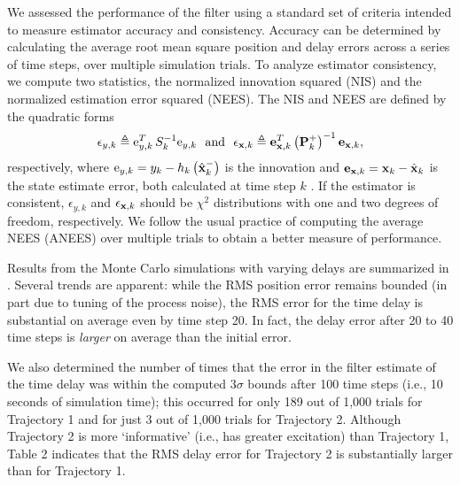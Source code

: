 \documentclass[letterpaper,10pt,conference]{ieeeconf}
\theoremstyle{definition}
\begin{document}
We assessed the performance of the filter using a standard set of criteria intended to measure estimator accuracy and consistency.
%
Accuracy can be determined by calculating the average root mean square position and delay  errors across a series of time steps, over multiple simulation trials.
%
To analyze estimator consistency, we compute two statistics, the normalized innovation squared (NIS) and the normalized estimation error squared (NEES). The NIS and NEES are defined by the quadratic forms
%
\begin{equation*}
\label{eqn:nees}
\epsilon_{y, k} \triangleq 
\mathrm{e}_{y, k}^{T}\,S_{k}^{-1} \mathrm{e}_{y, k}~~\text{and}~~
%
\epsilon_{\vect{x}, k} \triangleq 
\mathbf{e}_{\vect{x}, k}^{T} \left(\matr{P}^{+}_{k}\right)^{-1} \mathbf{e}_{\vect{x}, k},
\end{equation*}
%
respectively, where $\mathrm{e}_{y, k} = y_{k}-h_{k}\left(\hat{\boldsymbol{\mathbf{x}}}_{k}^{-}\right)$ is the innovation and $\mathbf{e}_{\boldsymbol{\mathbf{x}}, k} = \boldsymbol{\mathbf{x}}_{k} - \hat{\boldsymbol{\mathbf{x}}}_{k}$ is the state estimate error, both calculated at time step $k$ \cite{2001_Bar-Shalom_Estimation}.
%
If the estimator is consistent, $\epsilon_{y, k}$ and $\epsilon_{\boldsymbol{\mathbf{x}}, k}$ should be $\chi^{2}$ distributions with one and two degrees of freedom, respectively.
%
We follow the usual practice of computing the average NEES (ANEES) over multiple trials \cite{2001_Bar-Shalom_Estimation,2018_Chen_Weak} to obtain a better measure of performance.

Results from the Monte Carlo simulations with varying delays are summarized in .
%
Several trends are apparent: while the RMS position error remains bounded (in part due to tuning of the process noise), the RMS error for the time delay is substantial on average even by time step 20.
%
In fact, the delay error after 20 to 40 time steps is \emph{larger} on average than the initial error.

We also determined the number of times that the error in the filter estimate of the time delay was within the computed $3\sigma$ bounds after 100 time steps (i.e., 10 seconds of simulation time); this occurred for only 189 out of 1,000 trials for Trajectory 1 and for just 3 out of 1,000 trials for Trajectory 2.
%
Although Trajectory 2 is more `informative' (i.e., has greater excitation) than Trajectory 1, Table 2 indicates that the RMS delay error for Trajectory 2 is substantially larger than for Trajectory 1.
\end{document}
